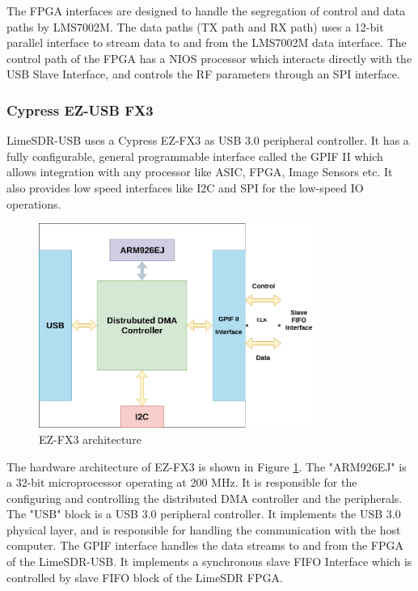 The \ac{FPGA} interfaces are designed to handle the segregation of control and data paths by LMS7002M.
The data paths (TX path and RX path) uses a 12-bit parallel interface to stream data to and from the LMS7002M data interface.
The control path of the \ac{FPGA} has a NIOS processor which interacts directly with the USB Slave Interface, and controls the \ac{RF} parameters through an \ac{SPI} interface.\\



\subsubsection{Cypress EZ-USB FX3}
LimeSDR-USB uses a Cypress EZ-FX3 \cite{noauthor_ez-usb_nodate} as \ac{USB} 3.0 peripheral controller.
It has a fully configurable, general programmable interface called the \ac{GPIF} II which allows integration with any processor like \ac{ASIC}, \ac{FPGA}, Image Sensors etc.
It also provides low speed interfaces like \ac{I2C} and \ac{SPI} for the low-speed \ac{IO} operations.\\

\begin{figure}[h!]
\centering
\hspace*{2.5cm}\includegraphics[width=0.8\textwidth]{Figure/FX3.png}
\caption{EZ-FX3 architecture}
\label{FX3_arch}
\end{figure}
The hardware architecture of EZ-FX3 is shown in Figure \ref{FX3_arch}.
The "ARM926EJ" is a 32-bit microprocessor operating at 200 MHz.
It is responsible for the configuring and controlling the distributed \ac{DMA} controller and the peripherals.
The "USB" block is a \ac{USB} 3.0 peripheral controller.
It implements the \ac{USB} 3.0 physical layer, and is responsible for handling the communication with the host computer.
The \ac{GPIF} interface handles the data streams to and from the \ac{FPGA} of the LimeSDR-USB. 
It implements a synchronous slave FIFO Interface which is controlled by slave FIFO block of the LimeSDR \ac{FPGA}.\\

